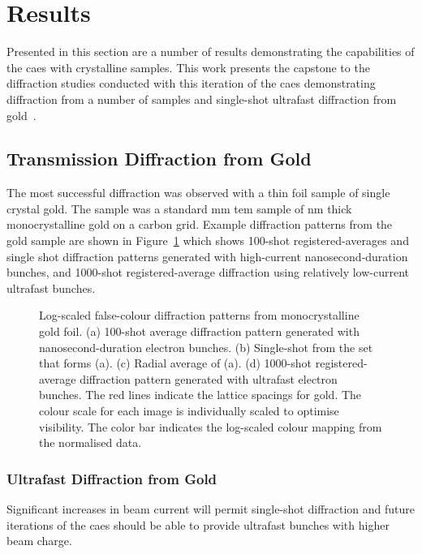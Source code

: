 \section{Results}

Presented in this section are a number of results demonstrating the capabilities of the \gls{caes} with crystalline samples.
This work presents the capstone to the diffraction studies conducted with this iteration of the \gls{caes} demonstrating diffraction from a number of samples and single-shot ultrafast diffraction from gold~\cite{speirs_single-shot_2015}.

\subsection{Transmission Diffraction from Gold}

The most successful diffraction was observed with a thin foil sample of single crystal gold.
The sample was a standard \unit[3]{mm} \gls{tem} sample of \unit[11]{nm} thick monocrystalline gold on a carbon grid.
Example diffraction patterns from the gold sample are shown in Figure~\ref{figure:au_diffraction} which shows 100-shot registered-averages and single shot diffraction patterns generated with high-current nanosecond-duration bunches, and 1000-shot registered-average diffraction using relatively low-current ultrafast bunches.

\begin{figure}
    \center
    
    \caption[Diffraction patterns from gold.]{Log-scaled false-colour diffraction patterns from monocrystalline gold foil. (a) 100-shot average diffraction pattern generated with nanosecond-duration electron bunches. (b) Single-shot from the set that forms (a). (c) Radial average of (a). (d) 1000-shot registered-average diffraction pattern generated with ultrafast electron bunches. The red lines indicate the lattice spacings for gold. The colour scale for each image is individually scaled to optimise visibility. The color bar indicates the log-scaled colour mapping from the normalised data.}
    \label{figure:au_diffraction}
\end{figure}

\subsubsection{Ultrafast Diffraction from Gold}

Significant increases in beam current will permit single-shot diffraction and future iterations of the \gls{caes} should be able to provide ultrafast bunches with higher beam charge.

